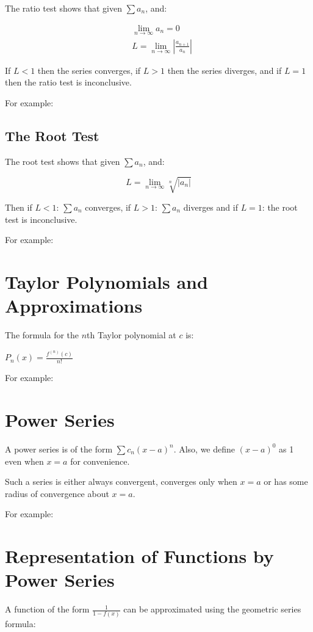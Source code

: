 \documentclass{article}
\let\oldsqrt\sqrt
\def\sqrt{\mathpalette\DHLhksqrt}
\def\DHLhksqrt#1#2{%
\setbox0=\hbox{$#1\oldsqrt{#2\,}$}\dimen0=\ht0
\advance\dimen0-0.2\ht0
\setbox2=\hbox{\vrule height\ht0 depth -\dimen0}%
{\box0\lower0.4pt\box2}}
\begin{document}
The ratio test shows that given $\sum a_n$, and:

\begin{align*}
  &\lim_{n \to \infty} a_n = 0 \\
  &L = \lim_{n \to \infty} \left| \frac{a_{n+1}}{a_n} \right|
\end{align*}

If $L<1$ then the series converges, if $L>1$ then the series diverges,
and if $L=1$ then the ratio test is inconclusive.

For example:

\subsection{The Root Test}

The root test shows that given $\sum a_n$, and:

\[
L = \lim_{n \to \infty} \oldsqrt[n]{\left| a_n \right|}
\]

Then if $L < 1$: $\sum a_n$ converges, if $L > 1$: $\sum a_n$
diverges and if $L = 1$: the root test is inconclusive.

For example:

\section{Taylor Polynomials and Approximations}

The formula for the $n$th Taylor polynomial at $c$ is:

$P_n(x) = \frac{f^{(n)}(c)}{n!}$

For example:

\section{Power Series}

A power series is of the form $\sum c_n(x-a)^n$.  Also, we define
$(x-a)^0$ as 1 even when $x=a$ for convenience.

Such a series is either always convergent, converges only when $x=a$
or has some radius of convergence about $x=a$.

For example:

\section{Representation of Functions by Power Series}

A function of the form $\frac{1}{1-f(x)}$ can be approximated using
the geometric series formula:
\end{document}
